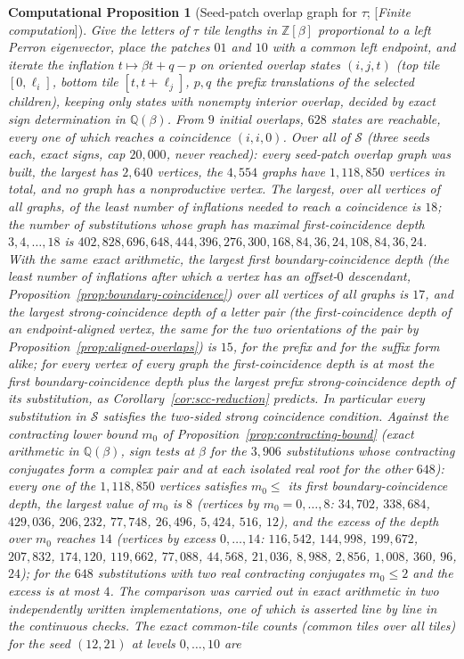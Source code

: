 \documentclass[11pt]{amsart}
\theoremstyle{plain}
\newtheorem{computation}[theorem]{Computational Proposition}
\theoremstyle{definition}
\theoremstyle{remark}
\newcommand{\Z}{\mathbb{Z}}
\newcommand{\Q}{\mathbb{Q}}
\newcommand{\Status}[1]{\textup{[\textit{#1}]}}
\begin{document}
\begin{computation}[Seed-patch overlap graph for $\tau$; \Status{Finite computation}]\label{comp:overlap}
Give the letters of $\tau$ tile lengths in $\Z[\beta]$ proportional to a left Perron eigenvector, place the patches $01$ and $10$ with a common left endpoint, and iterate the inflation $t\mapsto\beta t+q-p$ on oriented overlap states $(i,j,t)$ (top tile $[0,\ell_i]$, bottom tile $[t,t+\ell_j]$, $p,q$ the prefix translations of the selected children), keeping only states with nonempty interior overlap, decided by exact sign determination in $\Q(\beta)$. From $9$ initial overlaps, $628$ states are reachable, every one of which reaches a coincidence $(i,i,0)$. Over all of $\mathcal S$ (three seeds each, exact signs, cap $20{,}000$, never reached): every seed-patch overlap graph was built, the largest has $2{,}640$ vertices, the $4{,}554$ graphs have $1{,}118{,}850$ vertices in total, and no graph has a nonproductive vertex. The largest, over all vertices of all graphs, of the least number of inflations needed to reach a coincidence is $18$; the number of substitutions whose graph has maximal first-coincidence depth $3,4,\dots,18$ is $402,828,696,648,444,396,276,300,168,84,36,24,108,84,36,24$. With the same exact arithmetic, the largest first boundary-coincidence depth (the least number of inflations after which a vertex has an offset-$0$ descendant, Proposition~\ref{prop:boundary-coincidence}) over all vertices of all graphs is $17$, and the largest strong-coincidence depth of a letter pair (the first-coincidence depth of an endpoint-aligned vertex, the same for the two orientations of the pair by Proposition~\ref{prop:aligned-overlaps}) is $15$, for the prefix and for the suffix form alike; for every vertex of every graph the first-coincidence depth is at most the first boundary-coincidence depth plus the largest prefix strong-coincidence depth of its substitution, as Corollary~\ref{cor:scc-reduction} predicts. In particular every substitution in $\mathcal S$ satisfies the two-sided strong coincidence condition. Against the contracting lower bound $m_0$ of Proposition~\ref{prop:contracting-bound} (exact arithmetic in $\Q(\beta)$, sign tests at $\beta$ for the $3{,}906$ substitutions whose contracting conjugates form a complex pair and at each isolated real root for the other $648$): every one of the $1{,}118{,}850$ vertices satisfies $m_0\le$ its first boundary-coincidence depth, the largest value of $m_0$ is $8$ (vertices by $m_0=0,\dots,8$: $34{,}702$, $338{,}684$, $429{,}036$, $206{,}232$, $77{,}748$, $26{,}496$, $5{,}424$, $516$, $12$), and the excess of the depth over $m_0$ reaches $14$ (vertices by excess $0,\dots,14$: $116{,}542$, $144{,}998$, $199{,}672$, $207{,}832$, $174{,}120$, $119{,}662$, $77{,}088$, $44{,}568$, $21{,}036$, $8{,}988$, $2{,}856$, $1{,}008$, $360$, $96$, $24$); for the $648$ substitutions with two real contracting conjugates $m_0\le2$ and the excess is at most $4$. The comparison was carried out in exact arithmetic in two independently written implementations, one of which is asserted line by line in the continuous checks. The exact common-tile counts (common tiles over all tiles) for the seed $(12,21)$ at levels $0,\dots,10$ are 
\end{computation}
\end{document}
